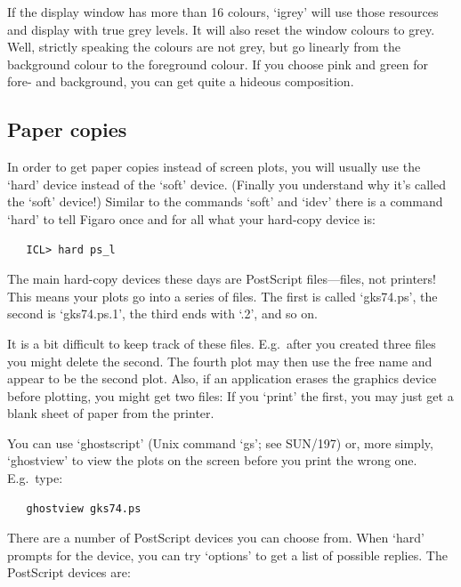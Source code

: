 \documentclass[11pt,twoside]{article}
\newcommand{\xref}[3]{#1}
\newcommand{\xlabel}[1]{}
\newcommand{\latorhtm}[2]{#1}
\newcommand{\latorhtm}[2]{#2}
\begin{document}
   If the display window has more than 16 colours, `igrey' will use
   those resources and display with true grey levels. It will also reset
   the window colours to grey. Well, strictly speaking the colours are
   not grey, but go linearly from the background colour to the
   foreground colour. If you choose pink and green for fore- and
   background, you can get quite a hideous composition.


\subsection{\xlabel{hardcopy}\label{hardcopy}Paper copies}

   In order to get paper copies instead of screen plots, you will
   usually use the `hard' device instead of the `soft' device. (Finally
   you understand why it's called the `soft' device!) Similar to the
   commands `soft' and `idev' there is a command `hard' to tell Figaro
   once and for all what your hard-copy device is:

\begin{verbatim}
   ICL> hard ps_l
\end{verbatim}

   The main hard-copy devices these days are PostScript
   files\latorhtm{---}{-}files,
   not printers! This means your plots go into a series of files. The
   first is called `gks74.ps', the second is `gks74.ps.1', the third
   ends with `.2', and so on.

   It is a bit difficult to keep track of these files. E.g.\ after you
   created three files you might delete the second. The fourth plot may
   then use the free name and appear to be the second plot. Also, if an
   application erases the graphics device before plotting, you might get
   two files: If you `print' the first, you may just get a blank sheet
   of paper from the printer.

   You can use `ghostscript' (Unix command `gs'; see
   \xref{SUN/197}{sun197}{}) or, more simply, `ghostview' to view the
   plots on the screen before you print the wrong one.  E.g.\ type:

\begin{verbatim}
   ghostview gks74.ps
\end{verbatim}

   There are a number of PostScript devices you can choose from. When
   `hard' prompts for the device, you can try `options' to get a list of
   possible replies. The PostScript devices are:
\end{document}
